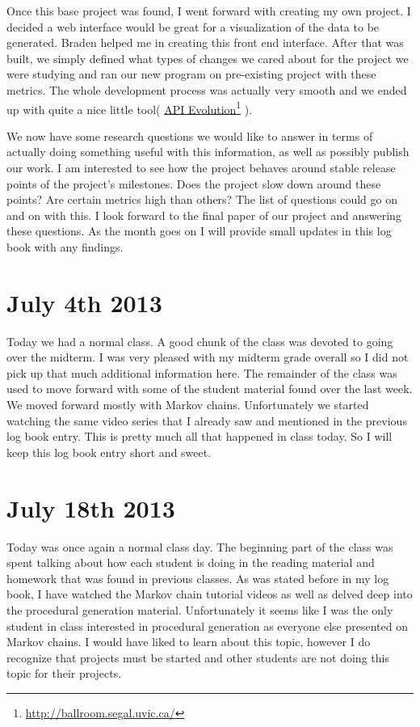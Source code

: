 \documentclass[conference]{IEEEtran}
\newcommand\fnurl[2]{%
  \href{#2}{#1}\footnote{\url{#2}}%
}
\begin{document}
Once this base project was found, I went forward with creating my own project. I decided a web interface would be
great for a visualization of the data to be generated. Braden helped me in creating this front end interface. After
that was built, we simply defined what types of changes we cared about for the project we were studying and ran our
new program on pre-existing project with these metrics. The whole development process was actually very smooth and
we ended up with quite a nice little tool(\fnurl{API Evolution}{http://ballroom.segal.uvic.ca/}). 

We now have some research questions we would like to answer in terms of actually doing something useful with this
information, as well as possibly publish our work. I am interested to see how the project behaves around stable release
points of the project's milestones. Does the project slow down around these points? Are certain metrics high than others?
The list of questions could go on and on with this. I look forward to the final paper of our project and answering
these questions. As the month goes on I will provide small updates in this log book with any findings.

\section{July 4th 2013}
Today we had a normal class. A good chunk of the class was devoted to going over the midterm. I was very pleased
with my midterm grade overall so I did not pick up that much additional information here. The remainder of the class
was used to move forward with some of the student material found over the last week. We moved forward mostly with
Markov chains. Unfortunately we started watching the same video series that I already saw and mentioned in the previous
log book entry. This is pretty much all that happened in class today. So I will keep this log book entry short and sweet.

\section{July 18th 2013}
Today was once again a normal class day. The beginning part of the class was spent talking about how each student is
doing in the reading material and homework that was found in previous classes. As was stated before in my log book,
I have watched the Markov chain tutorial videos as well as delved deep into the procedural generation material. Unfortunately
it seems like I was the only student in class interested in procedural generation as everyone else presented on Markov
chains. I would have liked to learn about this topic, however I do recognize that projects must be started and 
other students are not doing this topic for their projects.
\end{document}

